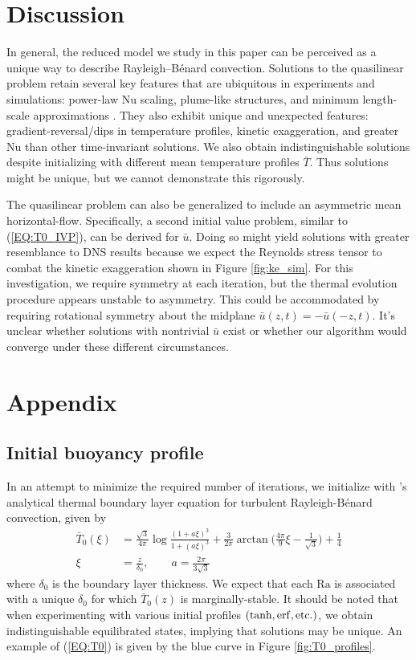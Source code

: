 \documentclass[reprint,amsmath,amssymb,aps]{revtex4-1}
\newcommand\Ra{\mathrm{Ra}}
\newcommand\Nu{\mathrm{Nu}}
\begin{document}
\section{Discussion}\label{sec:Discussion}
In general, the reduced model we study in this paper can be perceived as a unique way to describe Rayleigh–Bénard convection. 
Solutions to the quasilinear problem retain several key features that are ubiquitous in experiments and simulations: power-law $\Nu$ scaling, plume-like structures, and minimum length-scale approximations \cite{Malkus}. 
They also exhibit unique and unexpected features: gradient-reversal/dips in temperature profiles, kinetic exaggeration, and greater $\Nu$ than other time-invariant solutions. 
We also obtain indistinguishable solutions despite initializing with different mean temperature profiles $\bar{T}$. 
Thus solutions might be unique, but we cannot demonstrate this rigorously.

The quasilinear problem can also be generalized to include an asymmetric mean horizontal-flow. 
Specifically, a second initial value problem, similar to (\ref{EQ:T0_IVP}), can be derived for $\bar{u}$. 
Doing so might yield solutions with greater resemblance to DNS results because we expect the Reynolds stress tensor to combat the kinetic exaggeration shown in Figure \ref{fig:ke_sim}. 
For this investigation, we require symmetry at each iteration, but the thermal evolution procedure appears unstable to asymmetry. 
This could be accommodated by requiring rotational symmetry about the midplane $\bar{u}(z, t) = -\bar{u}(-z, t)$. 
It's unclear whether solutions with nontrivial $\bar{u}$ exist or whether our algorithm would converge under these different circumstances.

\section*{Appendix}
\subsection{Initial buoyancy profile} \label{sec:initial_profile}
In an attempt to minimize the required number of iterations, we initialize with \cite{Shishkina}'s analytical thermal boundary layer equation for turbulent Rayleigh-B\'enard convection, given by 
\begin{align}
    \bar{T}_0(\xi) &= \frac{\sqrt{3}}{4\pi} \log \frac{(1 + a\xi)^3}{1 + (a\xi)^3} + \frac{3}{2\pi} \arctan \Big( \frac{4\pi}{9}\xi - \frac{1}{\sqrt{3}} \Big) + \frac{1}{4} \nonumber \\
    \xi &= \frac{z}{\delta_0}, \qquad a = \frac{2\pi}{3\sqrt{3}}\label{EQ:T0}
\end{align}
where $\delta_0$ is the boundary layer thickness. 
We expect that each $\Ra$ is associated with a unique $\delta_0$ for which $\bar{T}_0(z)$ is marginally-stable. 
It should be noted that when experimenting with various initial profiles $(\tanh, \rm{erf}, \rm{etc.})$, we obtain indistinguishable equilibrated states, implying that solutions may be unique. 
An example of (\ref{EQ:T0}) is given by the blue curve in Figure \ref{fig:T0_profiles}.
\end{document}
